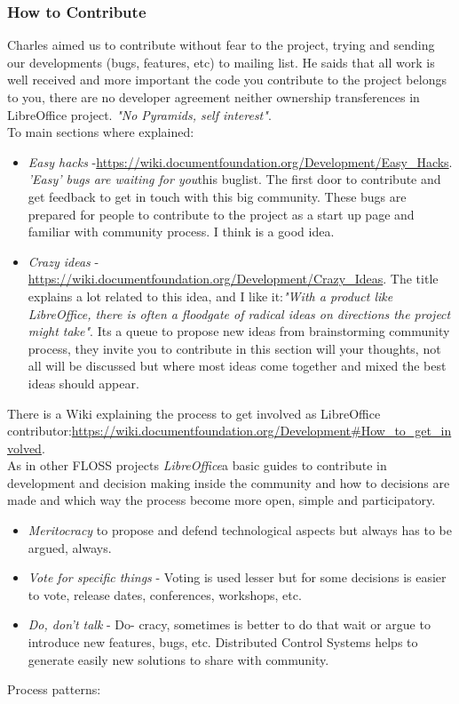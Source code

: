 \subsubsection{ How to Contribute} Charles aimed us to contribute without fear to the project, trying and sending our developments (bugs, features, etc) to mailing list. He saids that all work is well received and more important the code you contribute to the project belongs to you, there are no developer agreement neither ownership transferences in LibreOffice project. \textit{"No Pyramids, self interest"}.
\\ To main sections where explained:
\begin{itemize}
	\item \textit{Easy hacks} -\nolinebreak\href{https://wiki.documentfoundation.org/Development/Easy_Hacks}{https://wiki.documentfoundation.org/Development/Easy\_Hacks}. \textit{'Easy' bugs are waiting for you}\nolinebreakin this buglist. The first door to contribute and get feedback to get in touch with this big community. These bugs are prepared for people to contribute to the project as a start up page and familiar with community process. I think is a good idea.
	\item \textit{Crazy ideas} -\nolinebreak\href{https://wiki.documentfoundation.org/Development/Crazy_Ideas}{https://wiki.documentfoundation.org/Development/Crazy\_Ideas}. The title explains a lot related to this idea, and I like it:\nolinebreak\textit{"With a product like LibreOffice, there is often a floodgate of radical ideas on directions the project might take"}. Its a queue to propose new ideas from brainstorming community process, they invite you to contribute in this section will your thoughts, not all will be discussed but where most ideas come together and mixed the best ideas should appear.
\end{itemize} There is a Wiki explaining the process to get involved as LibreOffice contributor:\nolinebreak\href{https://wiki.documentfoundation.org/Development#How_to_get_involved}{https://wiki.documentfoundation.org/Development\#How\_to\_get\_involved}.
\\ As in other FLOSS projects \textit{LibreOffice}\nolinebreakhas a basic guides to contribute in development \nolinebreakprocess and decision making inside the community and how to decisions are made and which way the process become more open, simple and participatory.
\begin{itemize}
	\item \textit{Meritocracy} to propose and defend technological aspects but always has to be argued, always.
	\item \textit{Vote for specific things} - Voting is used lesser but for some decisions is easier to vote, release dates, conferences, workshops, etc.
	\item \textit{Do, don't talk} - Do- cracy, sometimes is better to do that wait or argue to introduce new features, bugs, etc. Distributed Control Systems helps to generate easily new solutions to share with community.
\end{itemize} Process patterns:
